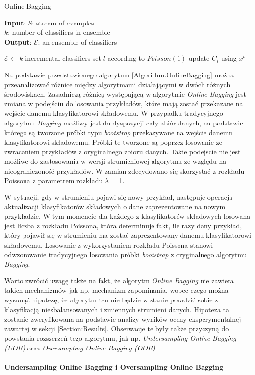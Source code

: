 \begin{algorithm}
    \caption{Online Bagging \cite{Article:OnlineBagging}}\label{Algorithm:OnlineBagging}
    \textbf{Input}: $S$: stream of examples \\
    \hspace*{12mm} $k$: number of classifiers in ensemble \\
    \textbf{Output}: $\mathcal{E}$: an ensemble of classifiers \\
    \begin{algorithmic}[1]
    \State $\mathcal{E} \gets k$ incremental classifiers
    \State set $l$ according to $Poisson(1)$
    \State update $C_i$ using $x^t$
    \EndFor
    \EndFor
    \EndFor
    \end{algorithmic}
\end{algorithm}

\noindent Na podstawie przedstawionego algorytmu \ref{Algorithm:OnlineBagging} można przeanalizować różnice między algorytmami działającymi w dwóch różnych środowiskach. Zasadniczą różnicą występującą w algorytmie \textit{Online Bagging} jest zmiana w podejściu do losowania przykładów, które mają zostać przekazane na wejście danemu klasyfikatorowi składowemu. W przypadku tradycyjnego algorytmu \textit{Bagging} możliwy jest do dyspozycji cały zbiór danych, na podstawie którego są tworzone próbki typu \textit{bootstrap} przekazywane na wejście danemu klasyfikatorowi składowemu. Próbki te tworzone są poprzez losowanie ze zwracaniem przykładów z oryginalnego zbioru danych. Takie podejście nie jest możliwe do zastosowania w wersji strumieniowej algorytmu ze względu na nieograniczoność przykładów. W zamian zdecydowano się skorzystać z rozkładu Poissona z parametrem rozkładu $\lambda$ = 1. 

W sytuacji, gdy w strumieniu pojawi się nowy przykład, następuje operacja aktualizacji klasyfikatorów składowych o dane zaprezentowane na nowym przykładzie. W tym momencie dla każdego z klasyfikatorów składowych losowana jest liczba z rozkładu Poissona, która determinuje fakt, ile razy dany przykład, który pojawił się w strumieniu ma zostać zaprezentowany danemu klasyfikatorowi składowemu. Losowanie z wykorzystaniem rozkładu Poissona stanowi odwzorowanie tradycyjnego losowania próbki \textit{bootstrap} z oryginalnego algorytmu \textit{Bagging}.

Warto zwrócić uwagę także na fakt, że algorytm \textit{Online Bagging} nie zawiera takich mechanizmów jak np. mechanizm zapominania, wobec czego można wysunąć hipotezę, że algorytm ten nie będzie w stanie poradzić sobie z klasyfikacją niezbalansowanych i zmiennych strumieni danych. Hipoteza ta zostanie zweryfikowana na podstawie analizy wyników oceny eksperymentalnej zawartej w sekcji \ref{Section:Results}. Obserwacje te były także przyczyną do powstania rozszerzeń tego algorytmu, jak np. \textit{Undersampling Online Bagging (UOB)} oraz \textit{Oversampling Online Bagging (OOB)} \cite{Article:OBFirst}\cite{Article:OBSecond}.\\\\
\textbf{Undersampling Online Bagging i Oversampling Online Bagging}\\

